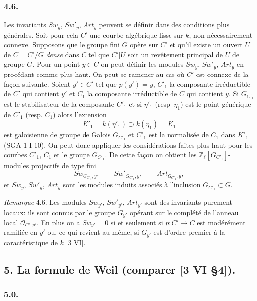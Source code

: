\subsubsection*{4.6.}

Les
invariants $Sw_y$, $Sw'_y$, $Art_y$ peuvent se définir dans des conditions plus générales. Soit pour cela $C'$ une courbe algébrique lisse sur $k$, non nécessairement connexe. Supposons que le groupe fini $G$ opère sur $C'$ et qu'il existe un ouvert $U$ de $C=C'/G$ \emph{dense} dans $C$ tel que $C'|U$ soit un revêtement principal de $U$ de groupe $G$. Pour un point $y\in C$ on peut définir les modules $Sw_y$, $Sw'_y$, $Art_y$ en procédant comme plus haut. On peut se ramener au cas où $C'$ est connexe de la façon suivante. Soient $y'\in C'$ tel que $p(y')=y$, $C'_1$ la composante irréductible de $C'$ qui contient $y'$ et $C_1$ la composante irréductible de $C$ qui contient $y$. Si $G_{C'_1}$ est le stabilisateur de la composante $C'_1$ et si $\eta'_1$ (resp. $\eta_1$) est le point générique de $C'_1$ (resp. $C_1$) alors l'extension
\[
K'_1=k(\eta'_1)\supset k(\eta_1)=K_1
\]
est galoisienne de groupe de Galois $G_{C'_1}$ et $C'_1$ est la normalisée de $C_1$ dans $K'_1$ (SGA 1 I 10). On peut donc appliquer les considérations faites plus haut pour les courbes $C'_1$, $C_1$ et le groupe $G_{C'_1}$. De cette façon on obtient les $\mathbb{Z}_\ell[G_{C'_1}]$-modules projectifs de type fini
\[
Sw_{G_{C'_1},y},\qquad Sw'_{G_{C'_1},y},\qquad Art_{G_{C'_1},y},
\]
et $Sw_y$, $Sw'_y$, $Art_y$ sont les modules induits associés à l'inclusion $G_{C'_1}\subset G$.

\emph{Remarque} 4.6. Les modules $Sw_{y'}$, $Sw'_{y'}$, $Art_{y'}$ sont des invariants purement locaux: ils sont connus par le groupe $G_{y'}$ opérant sur le complété de l'anneau local $\mathcal{O}_{C',y'}$. En plus on a $Sw_{y'}=0$ si et seulement si $p:C'\to C$ est modérément ramifiée en $y'$ ou, ce qui revient au même, si $G_{y'}$ est d'ordre premier à la caractéristique de $k$ [3 VI].

\subsection*{5. La formule de Weil (comparer [3 VI §4]).}

\subsubsection*{5.0.}

